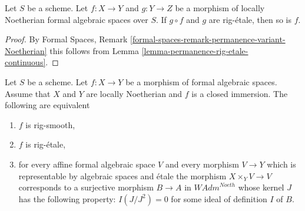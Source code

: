 \begin{lemma}
\label{lemma-rig-etale-permanence}
Let $S$ be a scheme. Let $f : X \to Y$ and $g : Y \to Z$
be a morphism of locally Noetherian formal algebraic spaces over $S$.
If $g \circ f$ and $g$ are rig-\'etale, then so is $f$.
\end{lemma}

\begin{proof}
By Formal Spaces, Remark
\ref{formal-spaces-remark-permanence-variant-Noetherian}
this follows from Lemma \ref{lemma-permanence-rig-etale-continuous}.
\end{proof}

\begin{lemma}
\label{lemma-closed-immersion-rig-smooth}
Let $S$ be a scheme. Let $f : X \to Y$ be a morphism of formal algebraic
spaces. Assume that $X$ and $Y$ are locally Noetherian and $f$ is a
closed immersion. The following are equivalent
\begin{enumerate}
\item $f$ is rig-smooth,
\item $f$ is rig-\'etale,
\item for every affine formal algebraic space $V$ and every morphism
$V \to Y$ which is representable by algebraic spaces and \'etale
the morphism $X \times_Y V \to V$ corresponds to a surjective morphism
$B \to A$ in $\textit{WAdm}^{Noeth}$ whose kernel $J$ has the following
property: $I(J/J^2) = 0$ for some ideal of definition $I$ of $B$.
\end{enumerate}
\end{lemma}


